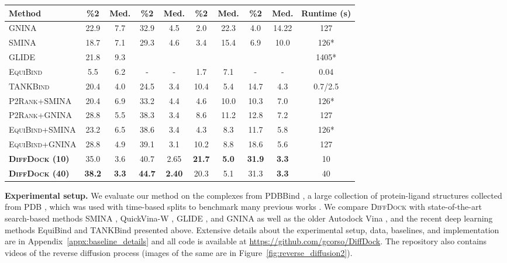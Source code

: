 \documentclass{article} \usepackage{iclr2023_conference,times}
\newcommand{\new}[1]{#1}
\begin{document}
\begin{table}[t]
\begin{small}
\begin{center}
\begin{tabular}{lcc|cc|cc|cc|c}
        Method & \%2 & Med. & \%2 & Med. & \%2 & Med. & \%2 & Med. &  Runtime (s)  \\
    \midrule
    \textsc{GNINA}              & 22.9 & 7.7  & 32.9 & 4.5  & 2.0 & 22.3  & 4.0 & 14.22 &  127  \\
    \textsc{SMINA}              & 18.7 & 7.1  & 29.3 & 4.6  & 3.4 & 15.4  & 6.9 & 10.0 &  126*   \\
    \textsc{GLIDE}              & 21.8 & 9.3  &      &      & & & & & 1405* \\
    \textsc{EquiBind}           & 5.5  & 6.2  &  -   &  -   & 1.7 & 7.1  & - & - &  0.04  \\ \midrule
    \textsc{TANKBind}           & 20.4 & 4.0  & 24.5 & 3.4  & 10.4 & 5.4 & 14.7 & 4.3 & 0.7/2.5  \\
    \textsc{P2Rank+SMINA}       & 20.4 & 6.9  & 33.2 & 4.4  & 4.6 & 10.0  & 10.3 & 7.0 & 126* \\ 
    \textsc{P2Rank+GNINA}       & 28.8 & 5.5  & 38.3 & 3.4  & 8.6 & 11.2  & 12.8 &  7.2 & 127  \\ 
    \textsc{EquiBind+SMINA}     & 23.2 & 6.5  & 38.6 & 3.4  & 4.3 & 8.3  & 11.7 & 5.8 & 126*  \\
    \textsc{EquiBind+GNINA}     & 28.8 & 4.9  & 39.1 & 3.1  & 10.2 & 8.8  & 18.6 & 5.6 & 127   \\ \midrule
\textbf{\textsc{DiffDock} (10)}  & 35.0 & 3.6  & 40.7 & 2.65  & \textbf{21.7} & \textbf{5.0}  & \textbf{31.9} & \textbf{3.3} &  10     \\
    \textbf{\textsc{DiffDock} (40)}  & \textbf{38.2} & \textbf{3.3}  & \textbf{44.7} & \textbf{2.40}  & 20.3 & 5.1  & 31.3 & \textbf{3.3} & 40      \\
    \bottomrule
    \end{tabular}
    \end{center}
    \end{small}
\vspace{-15pt}
\end{table}

\textbf{Experimental setup.} We evaluate our method on the complexes from PDBBind \citep{liu2017PDBBind}, a large collection of protein-ligand structures collected from PDB \citep{berman2003PDB}, which was used with time-based splits to benchmark many previous works  \citep{equibind, Volkov2022PDBBindSplits, Lu2022TankBind}. We compare \textsc{DiffDock} with state-of-the-art search-based methods SMINA \citep{koes2013smina}, QuickVina-W \citep{Hassan2017QVinaW}, GLIDE \citep{halgren2004glide}, and GNINA \citep{mcnutt2021gnina} \new{as well as the older Autodock Vina \citep{trott2010autodock}}, and the recent deep learning methods EquiBind and TANKBind presented above.  Extensive details about the experimental setup, data, baselines, and implementation are in Appendix~\ref{appx:baseline_details} and all code is available at \url{https://github.com/gcorso/DiffDock}. The repository also contains videos of the reverse diffusion process (images of the same are in Figure~\ref{fig:reverse_diffusion2}). 
\end{document}

